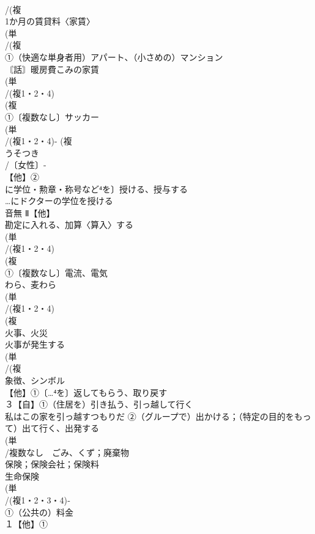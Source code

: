 \documentclass[8pt]{extreport}
\begin{document}
\begin{CJK}{UTF8}{min}
\\	/(複
\\	1か月の賃貸料〈家賃〉 
\\	(単
\\	/(複
\\	①（快適な単身者用）アパート、（小さめの）マンション 
\\	〘話〙暖房費こみの家賃 
\\	(単
\\	/(複1・2・4)
\\	(複
\\	①〔複数なし〕サッカー 
\\	(単
\\	/(複1・2・4)- (複
\\	うそつき 
\\	/〔女性〕-
\\	【他】②
\\	に学位・勲章・称号など⁴を〕授ける、授与する 
\\	…にドクターの学位を授ける
\\	音無	Ⅱ【他】
\\	勘定に入れる、加算〈算入〉する 
\\	(単
\\	/(複1・2・4)
\\	(複
\\	①〔複数なし〕電流、電気 
\\	わら、麦わら 
\\	(単
\\	/(複1・2・4)
\\	(複
\\	火事、火災 
\\	火事が発生する 
\\	(単
\\	/(複
\\	象徴、シンボル 
\\	【他】①〔…⁴を〕返してもらう、取り戻す 
\\	３【自】①（住居を）引き払う、引っ越して行く 
\\	私はこの家を引っ越すつもりだ ②（グループで）出かける；（特定の目的をもって）出て行く、出発する
\\	(単
\\	/複数なし　ごみ、くず；廃棄物 
\\	保険；保険会社；保険料 
\\	生命保険
\\	(単
\\	/(複1・2・3・4)‐
\\	①（公共の）料金 
\\	１【他】①

\end{CJK}
\end{document}
